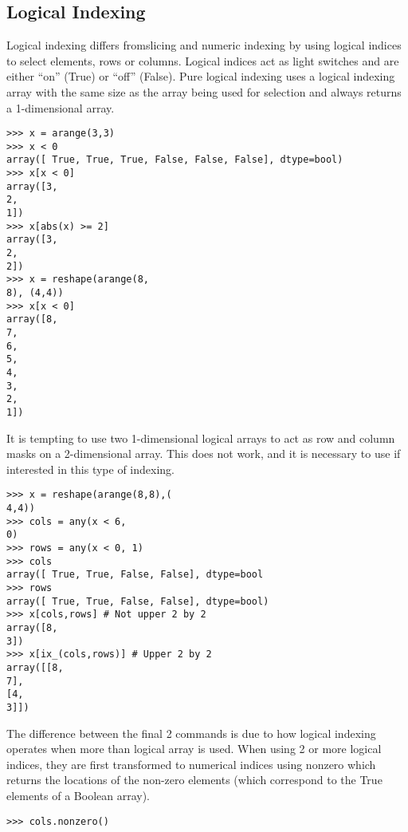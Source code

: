 \documentclass[KSmain.tex]{subfiles}
\begin{document}
\subsection{Logical Indexing}
Logical indexing differs fromslicing and numeric indexing by using logical indices to select elements, rows
or columns. Logical indices act as light switches and are either “on” (True) or “off” (False). Pure logical
indexing uses a logical indexing array with the same size as the array being used for selection and always
returns a 1-dimensional array.
\begin{framed}
\begin{verbatim}
>>> x = arange(3,3)
>>> x < 0
array([ True, True, True, False, False, False], dtype=bool)
>>> x[x < 0]
array([3,
2,
1])
>>> x[abs(x) >= 2]
array([3,
2,
2])
>>> x = reshape(arange(8,
8), (4,4))
>>> x[x < 0]
array([8,
7,
6,
5,
4,
3,
2,
1])
\end{verbatim}
\end{framed}
It is tempting to use two 1-dimensional logical arrays to act as row and column masks on a 2-dimensional
array. This does not work, and it is necessary to use  if interested in this type of indexing.
\begin{framed}
\begin{verbatim}
>>> x = reshape(arange(8,8),(
4,4))
>>> cols = any(x < 6,
0)
>>> rows = any(x < 0, 1)
>>> cols
array([ True, True, False, False], dtype=bool
>>> rows
array([ True, True, False, False], dtype=bool)
>>> x[cols,rows] # Not upper 2 by 2
array([8,
3])
>>> x[ix_(cols,rows)] # Upper 2 by 2
array([[8,
7],
[4,
3]])
\end{verbatim}
\end{framed}
The difference between the final 2 commands is due to how logical indexing operates when more than
logical array is used. When using 2 or more logical indices, they are first transformed to numerical indices
using nonzero which returns the locations of the non-zero elements (which correspond to the True
elements of a Boolean array).
\begin{framed}
\begin{verbatim}>>> cols.nonzero()
\end{verbatim}
\end{framed}
\end{document}
